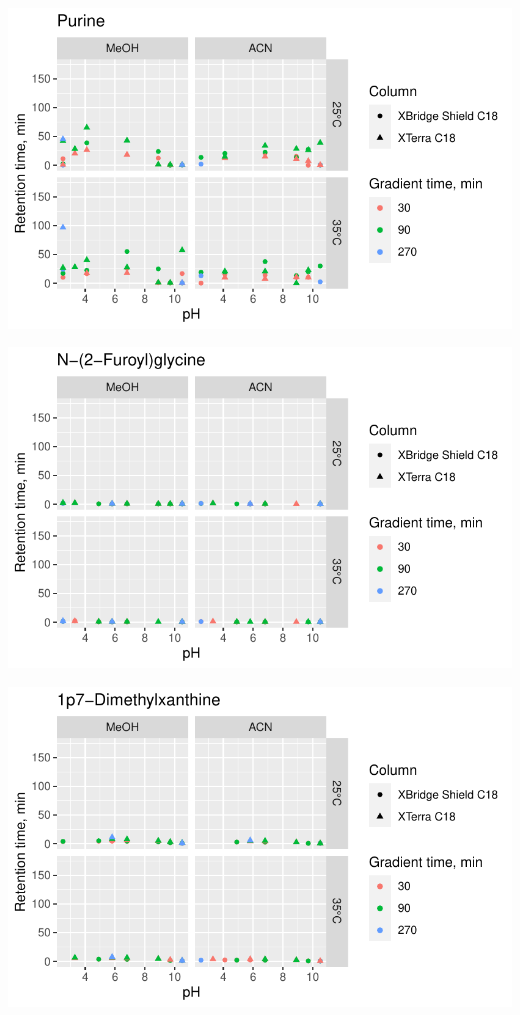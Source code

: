 \documentclass[
  letterpaper,
  DIV=11,
  numbers=noendperiod]{scrreprt}
\begin{document}
\includegraphics{index_files/figure-pdf/unnamed-chunk-4-153.pdf}

\includegraphics{index_files/figure-pdf/unnamed-chunk-4-154.pdf}

\includegraphics{index_files/figure-pdf/unnamed-chunk-4-155.pdf}
\end{document}
